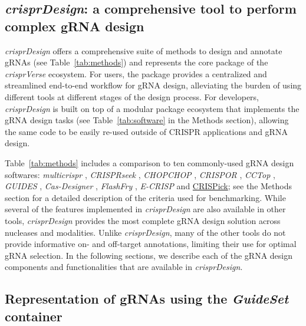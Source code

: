 \documentclass[pdftex,english,10pt]{article}
\begin{document}
\subsection*{\textit{crisprDesign}: a comprehensive tool to perform complex gRNA design}


\textit{crisprDesign} offers a comprehensive suite of methods to design and annotate gRNAs (see Table~\ref{tab:methods}) and represents the core package of the \textit{crisprVerse} ecosystem. For users, the package provides a centralized and streamlined end-to-end workflow for gRNA design, alleviating the burden of using different tools at different stages of the design process. For developers, \textit{crisprDesign} is built on top of a modular package ecosystem that implements the gRNA design tasks (see Table~\ref{tab:software} in the Methods section), allowing the same code to be easily re-used outside of CRISPR applications and gRNA design. 

Table~\ref{tab:methods} includes a comparison to ten commonly-used gRNA design softwares: \textit{multicrispr} \citep{multicrispr}, \textit{CRISPRseek} \citep{crisprseek}, \textit{CHOPCHOP} \citep{chopchop},  \textit{CRISPOR} \citep{crispor},  \textit{CCTop} \citep{cctop}, \textit{GUIDES} \citep{guides}, \textit{Cas-Designer} \citep{casdesigner}, \textit{FlashFry} \citep{flashfry}, \textit{E-CRISP} \citep{ecrisp} and \href{https://portals.broadinstitute.org/gppx/crispick/public}{CRISPick}; see the Methods section for a detailed description of the criteria used for benchmarking. While several of the features implemented in \textit{crisprDesign} are also available in other tools, \textit{crisprDesign} provides the most complete gRNA design solution across nucleases and modalities. Unlike \textit{crisprDesign}, many of the other tools do not provide informative on- and off-target annotations, limiting their use for optimal gRNA selection. In the following sections, we describe each of the gRNA design components and functionalities that are available in \textit{crisprDesign}.






\subsection*{Representation of gRNAs using the \textit{GuideSet} container}
\end{document}

